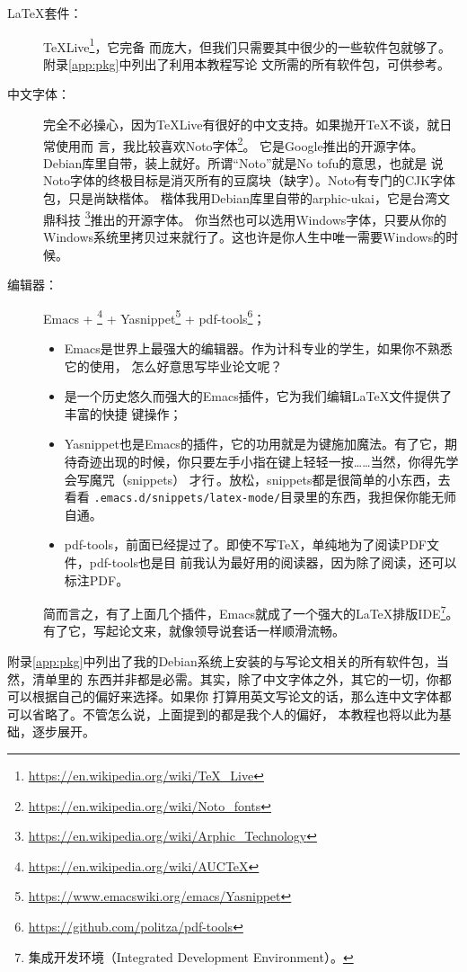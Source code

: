 \begin{description}
\item[\LaTeX{}套件：] TeXLive\footnote{\url{https://en.wikipedia.org/wiki/TeX_Live}}，它完备
  而庞大，但我们只需要其中很少的一些软件包就够了。附录\ref{app:pkg}中列出了利用本教程写论
  文所需的所有软件包，可供参考。
\item[中文字体：] 完全不必操心，因为TeXLive有很好的中文支持。如果抛开\TeX{}不谈，就日常使用而
  言，我比较喜欢Noto字体\footnote{\url{https://en.wikipedia.org/wiki/Noto_fonts}}。
  它是Google推出的开源字体。Debian库里自带，装上就好。所谓“Noto”就是No tofu的意思，也就是
  说Noto字体的终极目标是消灭所有的豆腐块（缺字）。Noto有专门的CJK字体包，只是尚缺楷体。%
  楷体我用Debian库里自带的arphic-ukai，它是台湾文鼎科技%
  \footnote{\url{https://en.wikipedia.org/wiki/Arphic_Technology}}推出的开源字体。
  你当然也可以选用Windows字体，只要从你的Windows系统里拷贝过来就行了。这也许是你人生中唯一需要Windows的时候。
\item[编辑器：]Emacs + \auctex\footnote{\url{https://en.wikipedia.org/wiki/AUCTeX}} +
  Yasnippet\footnote{\url{https://www.emacswiki.org/emacs/Yasnippet}} +
  pdf-tools\footnote{\url{https://github.com/politza/pdf-tools}}；
  \begin{itemize}
  \item Emacs是世界上最强大的编辑器\cite{emacs}。作为计科专业的学生，如果你不熟悉它的使用，
    怎么好意思写毕业论文呢？
  \item \auctex{}是一个历史悠久而强大的Emacs插件，它为我们编辑\LaTeX{}文件提供了丰富的快捷
    键操作\cite{auctex}；
  \item Yasnippet也是Emacs的插件，它的功用就是为{\Tab}键施加魔法\cite{yasnippet}。有了它，期
    待奇迹出现的时候，你只要左手小指在{\Tab}键上轻轻一按……当然，你得先学会写魔咒（snippets）
    才行\,\Frowny{}。\label{p:yasnippet}放松，snippets都是很简单的小东西，去看看
    \texttt{.emacs.d/snippets/latex-mode/}目录里的东西，我担保你能无师自通。
  \item pdf-tools，前面已经提过了。即使不写\TeX{}，单纯地为了阅读PDF文件，pdf-tools也是目
    前我认为最好用的阅读器，因为除了阅读，还可以标注PDF。    
  \end{itemize}

  简而言之，有了上面几个插件，Emacs就成了一个强大的\LaTeX{}排版IDE\footnote{集成开发环境（Integrated
    Development Environment）。}。有了它，写起论文来，就像领导说套话一样顺滑流畅。
\end{description}

附录\ref{app:pkg}中列出了我的Debian系统上安装的与写论文相关的所有软件包，当然，清单里的
东西并非都是必需。其实，除了中文字体之外，其它的一切，你都可以根据自己的偏好来选择。如果你
打算用英文写论文的话，那么连中文字体都可以省略了。不管怎么说，上面提到的都是我个人的偏好，
本教程也将以此为基础，逐步展开。

